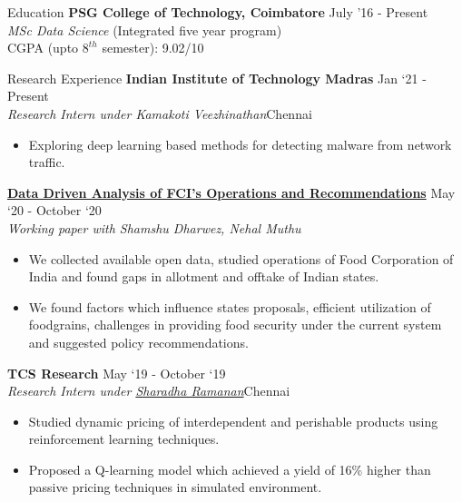 \documentclass{resume} %
\begin{document}
\begin{rSection}{Education}
\vspace*{0.1in}
{\bf PSG College of Technology, Coimbatore} \hfill {July '16 - Present} \\ {\emph{MSc Data Science} (Integrated  five year program)} \\
CGPA (upto $8^{th}$ semester): 9.02/10
\end{rSection}
\begin{rSection}{Research Experience}
\vspace*{0.1in}
{\bf Indian Institute of Technology Madras} { \hfill Jan `21 - Present} \\
\textit{Research Intern under Kamakoti Veezhinathan}{\hfill Chennai}
\begin{itemize}
	\item Exploring deep learning based methods for detecting malware from network traffic.
\end{itemize}

{\bf \href{https://arunpalaniappan.github.io/files/FCI.pdf}{Data Driven Analysis of FCI’s Operations and Recommendations}} { \hfill May `20 - October `20}\\
\textit{Working paper with Shamshu Dharwez, Nehal Muthu}
\begin{itemize}
\item We collected available open data, studied operations of Food Corporation of India and found gaps in allotment and offtake of Indian states.
\item We found factors which influence states proposals, efficient utilization of foodgrains, challenges in providing food security under the current system and suggested policy recommendations.
\end{itemize}

{\bf TCS Research} { \hfill May `19 - October `19}\\
\textit{Research Intern under \href{https://www.linkedin.com/in/sharadha-ramanan-43bb4946/}{Sharadha Ramanan}}{\hfill Chennai}
\begin{itemize}
	\item Studied dynamic pricing of interdependent and perishable products using reinforcement learning techniques.
	\item Proposed a Q-learning model which achieved a yield of 16\% higher than passive pricing techniques in simulated environment.
\end{itemize}
\end{rSection}
\end{document}
